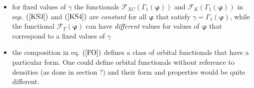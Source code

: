 \documentclass[aps,preprint]{revtex4}%
\begin{document}
\begin{itemize}
\item for fixed values of $\gamma$ the functionals $\mathcal{F}_{XC}\left(
\Gamma_{1}\left(  \boldsymbol{\varphi}\right)  \right)  $ and $\mathcal{F}%
_{K}\left(  \Gamma_{1}\left(  \boldsymbol{\varphi}\right)  \right)  $ in eqs.
$\left(  \ref{KS3}\right)  $ and $\left(  \ref{KS4}\right)  $ are
\emph{constant} for all $\boldsymbol{\varphi}$ that satisfy $\gamma=\Gamma
_{1}\left(  \boldsymbol{\varphi}\right)  $, while the functional
$\mathcal{F}_{T}\left(  \boldsymbol{\varphi}\right)  $ can have
\emph{different} values for values of $\boldsymbol{\varphi}$ that correspond
to a fixed values of $\gamma$

\item the composition in eq. $\left(  \ref{FO}\right)  $ defines a class of
orbital functionals that have a particular form. One could define orbital
functionals without reference to densities (as done in section ?) and their
form and properties would be quite different.
\end{itemize}
\end{document}
